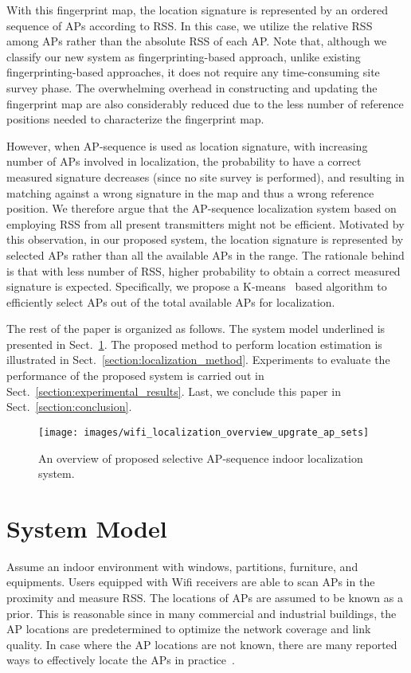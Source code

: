 \documentclass[10pt, conference, letterpaper]{IEEEtran}
\begin{document}
With this fingerprint map, the location signature is represented by an ordered sequence of APs according to RSS. 
In this case, we utilize the relative RSS among APs rather than the absolute RSS of each AP. 
Note that, although we classify our new system as fingerprinting-based approach, unlike existing fingerprinting-based approaches, 
it does not require any time-consuming site survey phase.
The overwhelming overhead in constructing and updating the fingerprint map are also considerably reduced due to the less number of reference positions needed to characterize the fingerprint map.

However, when AP-sequence is used as location signature, with increasing number of APs involved in localization, 
the probability to have a correct measured signature decreases (since no site survey is performed), and 
resulting in matching against a wrong signature in the map and thus a wrong reference position. 
We therefore argue that the AP-sequence localization system based on employing RSS from all present transmitters might not be efficient. 
Motivated by this observation, in our proposed system, the location signature is represented by selected APs rather than all the available APs in the range. 
The rationale behind is that with less number of RSS, higher probability to obtain a correct measured signature is expected. 
Specifically, we propose a K-means~\cite{Kmeans} based algorithm to efficiently select APs out of the total available APs for localization.

The rest of the paper is organized as follows. 
The system model underlined is presented in Sect.~\ref{section:system_model}. 
The proposed method to perform location estimation is illustrated in Sect.~\ref{section:localization_method}. 
Experiments to evaluate the performance of the proposed system is carried out in Sect.~\ref{section:experimental_results}. 
Last, we conclude this paper in Sect.~\ref{section:conclusion}.

\begin{figure}
\centering
\texttt{[image: images/wifi\_localization\_overview\_upgrate\_ap\_sets]}
\caption{An overview of proposed selective AP-sequence indoor localization system.}
\label{fig:system_overview}
\vspace{-0.05in}
\end{figure}

\section{System Model}
\label{section:system_model}
Assume an indoor environment with windows, partitions, furniture, and equipments. 
Users equipped with Wifi receivers are able to scan APs in the proximity and measure RSS.
The locations of APs are assumed to be known as a prior. 
This is reasonable since in many commercial and industrial buildings, the AP locations are predetermined to optimize the network coverage and link quality. 
In case where the AP locations are not known, there are many reported ways to effectively locate the APs in practice~\cite{Ref14}. 
\end{document}
